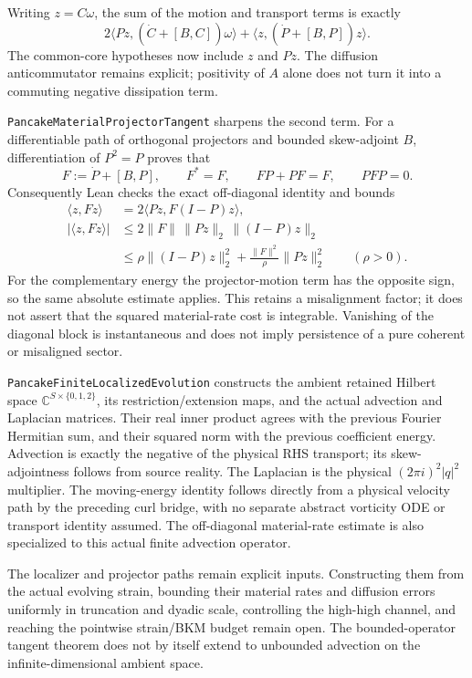 \documentclass[11pt]{article}
\theoremstyle{definition}
\begin{document}
Writing $z=C\omega$, the sum of the motion and transport terms is exactly
\[
 2\langle Pz,(\dot C+[B,C])\omega\rangle
   +\langle z,(\dot P+[B,P])z\rangle.
\]
The common-core hypotheses now include $z$ and $Pz$.
The diffusion anticommutator remains explicit; positivity of $A$ alone
does not turn it into a commuting negative dissipation term.

\texttt{PancakeMaterialProjectorTangent} sharpens the second term.
For a differentiable path of orthogonal projectors and bounded
skew-adjoint $B$, differentiation of $P^2=P$ proves that
\[
 F:=\dot P+[B,P],\qquad F^*=F,\qquad FP+PF=F,
 \qquad PFP=0.
\]
Consequently Lean checks the exact off-diagonal identity and bounds
\begin{align*}
 \langle z,Fz\rangle&=2\langle Pz,F(I-P)z\rangle,\\
 |\langle z,Fz\rangle|&\le2\|F\|\,\|Pz\|_2\,\|(I-P)z\|_2\\
 &\le\rho\|(I-P)z\|_2^2
        +\frac{\|F\|^2}{\rho}\|Pz\|_2^2\qquad(\rho>0).
\end{align*}
For the complementary energy the projector-motion term has the opposite
sign, so the same absolute estimate applies.  This retains a misalignment
factor; it does not assert that the squared material-rate cost is integrable.
Vanishing of the diagonal block is instantaneous and does not imply
persistence of a pure coherent or misaligned sector.

\texttt{PancakeFiniteLocalizedEvolution} constructs the ambient retained
Hilbert space $\mathbb C^{S\times\{0,1,2\}}$, its restriction/extension
maps, and the actual advection and Laplacian matrices.  Their real inner
product agrees with the previous Fourier Hermitian sum, and their squared
norm with the previous coefficient energy.  Advection is exactly the
negative of the physical RHS transport; its skew-adjointness follows from
source reality.  The Laplacian is the physical $(2\pi i)^2|q|^2$ multiplier.
The moving-energy identity follows directly from a physical velocity path
by the preceding curl bridge, with no separate abstract vorticity ODE or
transport identity assumed.  The off-diagonal material-rate estimate is
also specialized to this actual finite advection operator.

The localizer and projector paths remain explicit inputs.  Constructing
them from the actual evolving strain, bounding their material rates and
diffusion errors uniformly in truncation and dyadic scale, controlling the
high-high channel, and reaching the pointwise strain/BKM budget remain
open.  The bounded-operator tangent theorem does not by itself extend to
unbounded advection on the infinite-dimensional ambient space.
\end{document}
